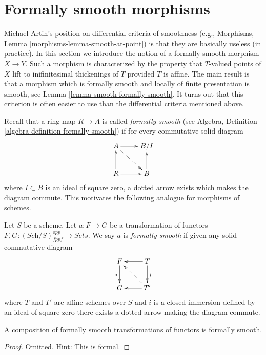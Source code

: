 \section{Formally smooth morphisms}
\label{section-formally-smooth}

\noindent
Michael Artin's position on differential criteria of smoothness (e.g.,
Morphisms, Lemma \ref{morphisms-lemma-smooth-at-point}) is that they are
basically useless (in practice). In this section we introduce the
notion of a formally smooth morphism $X \to Y$. Such a morphism is
characterized by the property that $T$-valued points of $X$ lift
to inifinitesimal thickenings of $T$ provided $T$ is affine.
The main result is that a morphism which is formally smooth and
locally of finite presentation is smooth, see
Lemma \ref{lemma-smooth-formally-smooth}.
It turns out that this criterion is often easier to use than the
differential criteria mentioned above.

\medskip\noindent
Recall that a ring map $R \to A$ is called {\it formally smooth}
(see Algebra, Definition \ref{algebra-definition-formally-smooth})
if for every commutative solid diagram
$$
\xymatrix{
A \ar[r] \ar@{-->}[rd] & B/I \\
R \ar[r] \ar[u] & B \ar[u]
}
$$
where $I \subset B$ is an ideal of square zero, a dotted
arrow exists which makes the diagram commute. This motivates
the following analogue for morphisms of schemes.

\begin{definition}
\label{definition-formally-smooth}
Let $S$ be a scheme.
Let $a : F \to G$ be a transformation of functors
$F, G : (\textit{Sch}/S)_{fppf}^{opp} \to \textit{Sets}$.
We say $a$ is {\it formally smooth} if given any solid commutative diagram
$$
\xymatrix{
F \ar[d]_a & T \ar[d]^i \ar[l] \\
G & T' \ar[l] \ar@{-->}[lu]
}
$$
where $T$ and $T'$ are affine schemes over $S$
and $i$ is a closed immersion defined
by an ideal of square zero there exists a dotted arrow making the diagram
commute.
\end{definition}

\begin{lemma}
\label{lemma-composition-formally-smooth}
A composition of formally smooth transformations of functors is formally
smooth.
\end{lemma}

\begin{proof}
Omitted. Hint: This is formal.
\end{proof}

